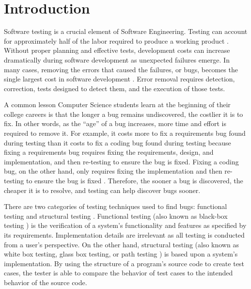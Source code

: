 
\chapter{Introduction}
Software testing is a crucial element of Software Engineering.  Testing can
account for approximately half of the labor required to produce a working
product \cite{Beizer:1990}.  Without proper planning and effective tests,
development costs can increase dramatically during software development as
unexpected failures emerge.  In many cases, removing the errors that caused
the failures, or bugs, becomes the single largest cost in software
development \cite{Beizer:1990}.  Error removal requires detection,
correction, tests designed to detect them, and the execution of those
tests.

A common lesson Computer Science students learn at the beginning of their
college careers is that the longer a bug remains undiscovered, the costlier
it is to fix.  In other words, as the ``age'' of a bug increases, more time
and effort is required to remove it.  For example, it costs more to fix a
requirements bug found during testing than it costs to fix a coding bug
found during testing because fixing a requirements bug requires fixing the
requirements, design, and implementation, and then re-testing to ensure the
bug is fixed.  Fixing a coding bug, on the other hand, only requires fixing
the implementation and then re-testing to ensure the bug is fixed
\cite{Humphrey:1995}.  Therefore, the sooner a bug is discovered, the
cheaper it is to resolve, and testing can help discover bugs sooner.

There are two categories of testing techniques used to find bugs:
functional testing and structural testing \cite{Beizer:1990}.  Functional
testing (also known as black-box testing \cite{Cornett}) is the
verification of a system's functionality and features as specified by its
requirements.  Implementation details are irrelevant as all testing is
conducted from a user's perspective.  On the other hand, structural testing
(also known as white box testing, glass box testing, or path testing
\cite{Cornett} \cite{Kaner:1999}) is based upon a system's implementation.
By using the structure of a program's source code to create test cases, the
tester is able to compare the behavior of test cases to the intended
behavior of the source code.

